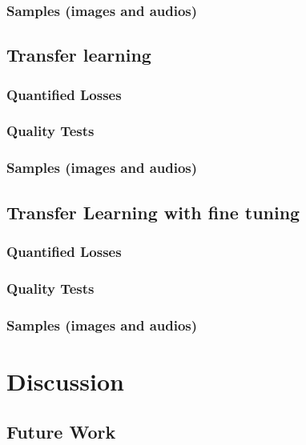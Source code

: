 \documentclass{book}
\begin{document}
\subsection{Samples (images and audios)}
\section{Transfer learning}
\subsection{Quantified Losses}
\subsection{Quality Tests}
\subsection{Samples (images and audios)}
\section{Transfer Learning with fine tuning}
\subsection{Quantified Losses}
\subsection{Quality Tests}
\subsection{Samples (images and audios)}

\chapter{Discussion}
\section{Future Work}
\end{document}
